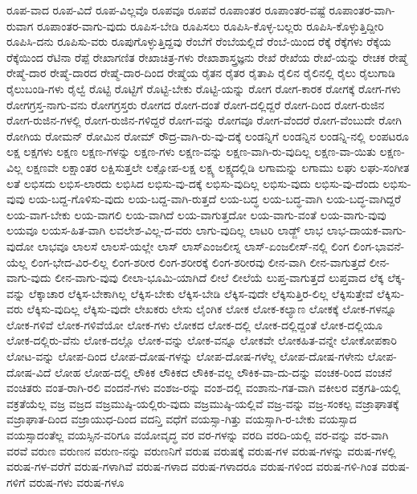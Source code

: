 {ರೂಪ-ವಾದ
ರೂಪ-ವಿದೆ
ರೂಪ-ವಿಲ್ಲವೊ
ರೂಪವೂ
ರೂಪವೆ
ರೂಪಾಂತರ
ರೂಪಾಂತರ-ವಷ್ಟೆ
ರೂಪಾಂತರ-ವಾಗಿ-ರುವಾಗ
ರೂಪಾಂತರ-ವಾಗು-ವುದು
ರೂಪಿಸ-ಬೇಡಿ
ರೂಪಿಸಲು
ರೂಪಿಸಿ-ಕೊಳ್ಳ-ಬಲ್ಲರು
ರೂಪಿಸಿ-ಕೊಳ್ಳುತ್ತಿದ್ದೀರಿ
ರೂಪಿಸಿ-ದನು
ರೂಪಿಸು-ವರು
ರೂಪುಗೊಳ್ಳುತ್ತಿದ್ದವು
ರೆಂಬೆಗೆ
ರೆಂಬೆಯಲ್ಲಿದೆ
ರೆಂಬೆ-ಯಿಂದ
ರೆಕ್ಕೆ
ರೆಕ್ಕೆಗಳು
ರೆಕ್ಕೆಯ
ರೆಕ್ಕೆಯಿಂದ
ರೆಟಿನಾ
ರೆಪ್ಪೆ
ರೇಖಾಗಣಿತ
ರೇಖಾಚಿತ್ರ-ಗಳು
ರೇಖಾಶಾಸ್ತ್ರಜ್ಞನು
ರೇಖೆ
ರೇಖೆಯ
ರೇಖೆ-ಯನ್ನು
ರೇಚಕ
ರೇಷ್ಮೆ
ರೇಷ್ಮೆ-ದಾರ
ರೇಷ್ಮೆ-ದಾರದ
ರೇಷ್ಮೆ-ದಾರ-ದಿಂದ
ರೇಷ್ಮೆಯ
ರೈತನ
ರೈತರ
ರೈತಾಪಿ
ರೈಲಿನ
ರೈಲಿನಲ್ಲಿ
ರೈಲು
ರೈಲುಗಾಡಿ
ರೈಲುಬಂಡಿ-ಗಳು
ರೈಲ್ವೆ
ರೊಟ್ಟಿ
ರೊಟ್ಟಿಗೆ
ರೊಟ್ಟಿ-ಬೇಕು
ರೊಟ್ಟಿ-ಯನ್ನು
ರೋಗ
ರೋಗ-ಕಾರಕ
ರೋಗಕ್ಕೆ
ರೋಗ-ಗಳು
ರೋಗಗ್ರಸ್ತ-ನಾಗು-ವನು
ರೋಗಗ್ರಸ್ತರು
ರೋಗದ
ರೋಗ-ದಂತೆ
ರೋಗ-ದಲ್ಲಿದ್ದರೆ
ರೋಗ-ದಿಂದ
ರೋಗ-ರುಜಿನ
ರೋಗ-ರುಜಿನ-ಗಳಲ್ಲಿ
ರೋಗ-ರುಜಿನ-ಗಳಿದ್ದರೆ
ರೋಗ-ವನ್ನು
ರೋಗವೂ
ರೋಗ-ವೆಂದರೆ
ರೋಗ-ವೆಂಬುದೇ
ರೋಗಿ
ರೋಗಿಯ
ರೋಮನ್
ರೋಮಿನ
ರೋಮ್
ರೌದ್ರ-ವಾಗಿ-ರು-ವು-ದಕ್ಕೆ
ಲಂಡನ್ನಿಗೆ
ಲಂಡನ್ನಿನ
ಲಂಡನ್ನಿ-ನಲ್ಲಿ
ಲಂಪಟರೂ
ಲಕ್ಷ
ಲಕ್ಷಗಳು
ಲಕ್ಷಣ
ಲಕ್ಷಣ-ಗಳನ್ನು
ಲಕ್ಷಣ-ಗಳು
ಲಕ್ಷಣ-ವನ್ನು
ಲಕ್ಷಣ-ವಾಗಿ-ರು-ವುದಿಲ್ಲ
ಲಕ್ಷಣ-ವಾ-ಯಿತು
ಲಕ್ಷಣ-ವಿಲ್ಲ
ಲಕ್ಷಣವೇ
ಲಕ್ಷಾಂತರ
ಲಕ್ಷಿಸುತ್ತಲೇ
ಲಕ್ಷೋಪ-ಲಕ್ಷ
ಲಕ್ಷ್ಯ
ಲಕ್ಷ್ಯದಲ್ಲಿಡಿ
ಲಗಾಮನ್ನು
ಲಗಾಮು
ಲಘು
ಲಘು-ಸಂಗೀತ
ಲತೆ
ಲಭಿಸದು
ಲಭಿಸ-ಲಾರದು
ಲಭಿಸಿದ
ಲಭಿಸು-ವು-ದಕ್ಕೆ
ಲಭಿಸು-ವುದಿಲ್ಲ
ಲಭಿಸು-ವುದು
ಲಭಿಸು-ವು-ದೆಂದು
ಲಭಿಸು-ವುವು
ಲಯ-ಬದ್ದ-ಗೊಳಿಸು-ವುದು
ಲಯ-ಬದ್ದ-ವಾಗಿ-ರುತ್ತದೆ
ಲಯ-ಬದ್ಧ
ಲಯ-ಬದ್ಧ-ವಾಗಿ
ಲಯ-ಬದ್ಧ-ವಾಗಿದ್ದರೆ
ಲಯ-ವಾಗ-ಬೇಕು
ಲಯ-ವಾಗಲಿ
ಲಯ-ವಾಗಿದೆ
ಲಯ-ವಾಗುತ್ತದೋ
ಲಯ-ವಾಗು-ವಂತೆ
ಲಯ-ವಾಗು-ವುವು
ಲಯವೂ
ಲಯಸ-ಹಿತ-ವಾಗಿ
ಲವಲೇಶ-ವಿಲ್ಲ-ದ-ವರು
ಲಾಗು-ವುದಿಲ್ಲ
ಲಾಟರಿ
ಲಾಡ್ಜ್
ಲಾಭ
ಲಾಭ-ದಾಯಕ-ವಾಗು-ವುದೋ
ಲಾಭವೂ
ಲಾಲಸೆ
ಲಾಲಸೆ-ಯಲ್ಲೇ
ಲಾಸ್
ಲಾಸ್ಎಂಜಲೀಸ್ನ
ಲಾಸ್-ಏಂಜಲೀಸ್-ನಲ್ಲಿ
ಲಿಂಗ
ಲಿಂಗ-ಭಾವನೆ-ಯೆಲ್ಲ
ಲಿಂಗ-ಭೇದ-ವಿರ-ಲಿಲ್ಲ
ಲಿಂಗ-ಶರೀರ
ಲಿಂಗ-ಶರೀರಕ್ಕೆ
ಲಿಂಗ-ಶರೀರವು
ಲೀನ-ವಾಗಿ
ಲೀನ-ವಾಗುತ್ತದೆ
ಲೀನ-ವಾಗು-ವುದು
ಲೀನ-ವಾಗು-ವುವು
ಲೀಲಾ-ಭೂಮಿ-ಯಾಗಿದೆ
ಲೀಲೆ
ಲೀಲೆಯೆ
ಲುಪ್ತ-ವಾಗುತ್ತದೆ
ಲುಪ್ತವಾದ
ಲೆಕ್ಕ
ಲೆಕ್ಕ-ವನ್ನು
ಲೆಕ್ಕಾಚಾರ
ಲೆಕ್ಕಿಸ-ಬೇಕಾಗಿಲ್ಲ
ಲೆಕ್ಕಿಸ-ಬೇಕು
ಲೆಕ್ಕಿಸ-ಬೇಡಿ
ಲೆಕ್ಕಿಸ-ವುದೇ
ಲೆಕ್ಕಿಸುತ್ತಿರ-ಲಿಲ್ಲ
ಲೆಕ್ಕಿಸುತ್ತೇವೆ
ಲೆಕ್ಕಿಸು-ವರು
ಲೆಕ್ಕಿಸು-ವುದಿಲ್ಲ
ಲೆಕ್ಕಿಸು-ವುದೇ
ಲೇಖಕರು
ಲೇಸು
ಲೈಂಗಿಕ
ಲೋಕ
ಲೋಕ-ಕಲ್ಯಾಣ
ಲೋಕಕ್ಕೆ
ಲೋಕ-ಗಳನ್ನೂ
ಲೋಕ-ಗಳಿವೆ
ಲೋಕ-ಗಳಿವೆಯೋ
ಲೋಕ-ಗಳು
ಲೋಕದ
ಲೋಕ-ದಲ್ಲಿ
ಲೋಕ-ದಲ್ಲಿದ್ದಂತೆ
ಲೋಕ-ದಲ್ಲಿಯೂ
ಲೋಕ-ದಲ್ಲಿರು-ವೆನು
ಲೋಕ-ದಲ್ಲೊ
ಲೋಕ-ವನ್ನು
ಲೋಕ-ವನ್ನೂ
ಲೋಕವೇ
ಲೋಕಹಿತ-ವನ್ನೇ
ಲೋಕೋಪಕಾರಿ
ಲೋಟ-ವನ್ನು
ಲೋಪ-ದಿಂದ
ಲೋಪ-ದೋಷ-ಗಳನ್ನು
ಲೋಪ-ದೋಷ-ಗಳೆಲ್ಲ
ಲೋಪ-ದೋಷ-ಗಳೇನು
ಲೋಪ-ದೋಷ-ವಿದೆ
ಲೋಹ
ಲೋಹ-ದಲ್ಲಿ
ಲೌಕಿಕ
ಲೌಕಿಕದ
ಲೌಕಿಕ-ವಲ್ಲ
ಲೌಕಿಕ-ವಾ-ದು-ದನ್ನು
ವಂಚಕ-ರಿಂದ
ವಂಚನೆ
ವಂಚಿತರು
ವಂತ-ರಾಗಿ-ರಲಿ
ವಂದನೆ-ಗಳು
ವಂಶಜ-ರನ್ನು
ವಂಶ-ದಲ್ಲಿ
ವಂಶಾನು-ಗತ-ವಾಗಿ
ವಕೀಲರ
ವಕ್ರಗತಿ-ಯಲ್ಲಿ
ವಕ್ರತೆಯೆಲ್ಲ
ವಜ್ರ
ವಜ್ರದ
ವಜ್ರಮುಷ್ಠಿ-ಯಲ್ಲಿರು-ವುದು
ವಜ್ರಮುಷ್ಠಿ-ಯಲ್ಲಿವೆ
ವಜ್ರ-ವನ್ನು
ವಜ್ರ-ಸಂಕಲ್ಪ
ವಜ್ರಾಘಾತಕ್ಕೆ
ವಜ್ರಾಘಾತ-ದಿಂದ
ವಜ್ರಾಯುಧ-ದಿಂದ
ವದನ್ತಿ
ವಧೆಗೆ
ವಯಸ್ಸಾ-ಗಿತ್ತು
ವಯಸ್ಸಾಗಿ-ರ-ಬೇಕು
ವಯಸ್ಸಾದ
ವಯಸ್ಸಾದಂತೆಲ್ಲ
ವಯಸ್ಸಿನ-ವರಿಗೂ
ವಯೋವೃದ್ಧ
ವರ
ವರ-ಗಳನ್ನು
ವರದಿ
ವರದಿ-ಯಲ್ಲಿ
ವರ-ವನ್ನು
ವರ-ವಾಗಿ
ವರವೆ
ವರುಣ
ವರುಣನ
ವರುಣ-ನನ್ನು
ವರುಣನಿಗೆ
ವರುಷ
ವರುಷಕ್ಕೆ
ವರುಷ-ಗಳ
ವರುಷ-ಗಳನ್ನು
ವರುಷ-ಗಳಲ್ಲಿ
ವರುಷ-ಗಳ-ವರೆಗೆ
ವರುಷ-ಗಳಾಗಿವೆ
ವರುಷ-ಗಳಾದ
ವರುಷ-ಗಳಾದರೂ
ವರುಷ-ಗಳಿಂದ
ವರುಷ-ಗಳಿ-ಗಿಂತ
ವರುಷ-ಗಳಿಗೆ
ವರುಷ-ಗಳು
ವರುಷ-ಗಳೂ
}

